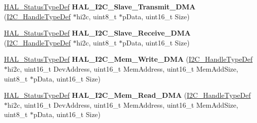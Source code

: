 \begin{DoxyCompactItemize}
\item 
\mbox{\label{group___i2_c___exported___functions___group2_ga59e69e0da57150f980deea0d235f0397}} 
\mbox{\hyperlink{stm32f7xx__hal__def_8h_a63c0679d1cb8b8c684fbb0632743478f}{H\+A\+L\+\_\+\+Status\+Type\+Def}} {\bfseries H\+A\+L\+\_\+\+I2\+C\+\_\+\+Slave\+\_\+\+Transmit\+\_\+\+D\+MA} (\mbox{\hyperlink{struct_____i2_c___handle_type_def}{I2\+C\+\_\+\+Handle\+Type\+Def}} $\ast$hi2c, uint8\+\_\+t $\ast$p\+Data, uint16\+\_\+t Size)
\item 
\mbox{\label{group___i2_c___exported___functions___group2_gad9dd42a10e5c108e30e6546cb64639c2}} 
\mbox{\hyperlink{stm32f7xx__hal__def_8h_a63c0679d1cb8b8c684fbb0632743478f}{H\+A\+L\+\_\+\+Status\+Type\+Def}} {\bfseries H\+A\+L\+\_\+\+I2\+C\+\_\+\+Slave\+\_\+\+Receive\+\_\+\+D\+MA} (\mbox{\hyperlink{struct_____i2_c___handle_type_def}{I2\+C\+\_\+\+Handle\+Type\+Def}} $\ast$hi2c, uint8\+\_\+t $\ast$p\+Data, uint16\+\_\+t Size)
\item 
\mbox{\label{group___i2_c___exported___functions___group2_ga12a2a86be393359534f630cdd090d8bb}} 
\mbox{\hyperlink{stm32f7xx__hal__def_8h_a63c0679d1cb8b8c684fbb0632743478f}{H\+A\+L\+\_\+\+Status\+Type\+Def}} {\bfseries H\+A\+L\+\_\+\+I2\+C\+\_\+\+Mem\+\_\+\+Write\+\_\+\+D\+MA} (\mbox{\hyperlink{struct_____i2_c___handle_type_def}{I2\+C\+\_\+\+Handle\+Type\+Def}} $\ast$hi2c, uint16\+\_\+t Dev\+Address, uint16\+\_\+t Mem\+Address, uint16\+\_\+t Mem\+Add\+Size, uint8\+\_\+t $\ast$p\+Data, uint16\+\_\+t Size)
\item 
\mbox{\label{group___i2_c___exported___functions___group2_gab25b99552182d2486d8eb441fffdd0a4}} 
\mbox{\hyperlink{stm32f7xx__hal__def_8h_a63c0679d1cb8b8c684fbb0632743478f}{H\+A\+L\+\_\+\+Status\+Type\+Def}} {\bfseries H\+A\+L\+\_\+\+I2\+C\+\_\+\+Mem\+\_\+\+Read\+\_\+\+D\+MA} (\mbox{\hyperlink{struct_____i2_c___handle_type_def}{I2\+C\+\_\+\+Handle\+Type\+Def}} $\ast$hi2c, uint16\+\_\+t Dev\+Address, uint16\+\_\+t Mem\+Address, uint16\+\_\+t Mem\+Add\+Size, uint8\+\_\+t $\ast$p\+Data, uint16\+\_\+t Size)
\item 
\mbox{\label{group___i2_c___exported___functions___group2_gace04b5c76cbe9b8f2293199df5cbebe7}} 

\end{DoxyCompactItemize}
